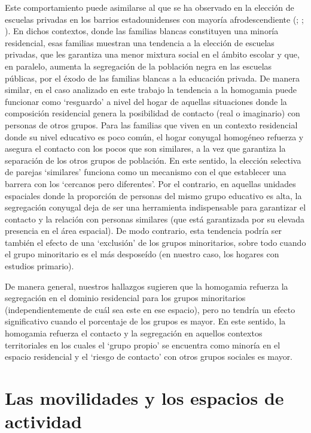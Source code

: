 \documentclass[
  spanish,
  a4paper,%
  chapterprefix=true,%
  DIV=calc,%
  twoside]{scrbook}%
\begin{document}
Este comportamiento puede asimilarse al que se ha observado en la
elección de escuelas privadas en los barrios estadounidenses con mayoría
afrodescendiente (; ; ). En
dichos contextos, donde las familias blancas constituyen una minoría
residencial, esas familias muestran una tendencia a la elección de
escuelas privadas, que les garantiza una menor mixtura social en el
ámbito escolar y que, en paralelo, aumenta la segregación de la
población negra en las escuelas públicas, por el éxodo de las familias
blancas a la educación privada. De manera similar, en el caso analizado
en este trabajo la tendencia a la homogamia puede funcionar como
`resguardo' a nivel del hogar de aquellas situaciones donde la
composición residencial genera la posibilidad de contacto (real o
imaginario) con personas de otros grupos. Para las familias que viven en
un contexto residencial donde su nivel educativo es poco común, el hogar
conyugal homogéneo refuerza y asegura el contacto con los pocos que son
similares, a la vez que garantiza la separación de los otros grupos de
población. En este sentido, la elección selectiva de parejas `similares'
funciona como un mecanismo con el que establecer una barrera con los
`cercanos pero diferentes'. Por el contrario, en aquellas unidades
espaciales donde la proporción de personas del mismo grupo educativo es
alta, la segregación conyugal deja de ser una herramienta indispensable
para garantizar el contacto y la relación con personas similares (que
está garantizada por su elevada presencia en el área espacial). De modo
contrario, esta tendencia podría ser también el efecto de una
`exclusión' de los grupos minoritarios, sobre todo cuando el grupo
minoritario es el más desposeído (en nuestro caso, los hogares con
estudios primario).

De manera general, nuestros hallazgos sugieren que la homogamia refuerza
la segregación en el dominio residencial para los grupos minoritarios
(independientemente de cuál sea este en ese espacio), pero no tendría un
efecto significativo cuando el porcentaje de los grupos es mayor. En
este sentido, la homogamia refuerza el contacto y la segregación en
aquellos contextos territoriales en los cuales el `grupo propio' se
encuentra como minoría en el espacio residencial y el `riesgo de
contacto' con otros grupos sociales es mayor.

\chapter{Las movilidades y los espacios de actividad}\label{mobilities}
\end{document}

